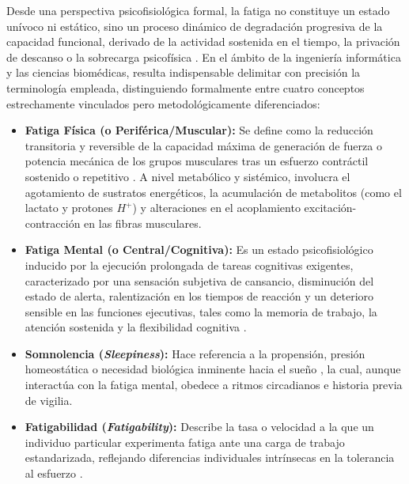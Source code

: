 Desde una perspectiva psicofisiológica formal, la fatiga no constituye un estado unívoco ni estático, sino un proceso dinámico de degradación progresiva de la capacidad funcional, derivado de la actividad sostenida en el tiempo, la privación de descanso o la sobrecarga psicofísica \cite{enoka2008muscle, grandjean1979fatigue}. En el ámbito de la ingeniería informática y las ciencias biomédicas, resulta indispensable delimitar con precisión la terminología empleada, distinguiendo formalmente entre cuatro conceptos estrechamente vinculados pero metodológicamente diferenciados:
\begin{itemize}
    \item \textbf{Fatiga Física (o Periférica/Muscular):} Se define como la reducción transitoria y reversible de la capacidad máxima de generación de fuerza o potencia mecánica de los grupos musculares tras un esfuerzo contráctil sostenido o repetitivo \cite{enoka2008muscle}. A nivel metabólico y sistémico, involucra el agotamiento de sustratos energéticos, la acumulación de metabolitos (como el lactato y protones $H^+$) y alteraciones en el acoplamiento excitación-contracción en las fibras musculares.
    \item \textbf{Fatiga Mental (o Central/Cognitiva):} Es un estado psicofisiológico inducido por la ejecución prolongada de tareas cognitivas exigentes, caracterizado por una sensación subjetiva de cansancio, disminución del estado de alerta, ralentización en los tiempos de reacción y un deterioro sensible en las funciones ejecutivas, tales como la memoria de trabajo, la atención sostenida y la flexibilidad cognitiva \cite{boksem2005effects}.
    \item \textbf{Somnolencia (\textit{Sleepiness}):} Hace referencia a la propensión, presión homeostática o necesidad biológica inminente hacia el sueño \cite{akerstedt1990subjective, hoddes1973quantification}, la cual, aunque interactúa con la fatiga mental, obedece a ritmos circadianos e historia previa de vigilia.
    \item \textbf{Fatigabilidad (\textit{Fatigability}):} Describe la tasa o velocidad a la que un individuo particular experimenta fatiga ante una carga de trabajo estandarizada, reflejando diferencias individuales intrínsecas en la tolerancia al esfuerzo \cite{kalanadhabhatta2021fatigueset}.
\end{itemize}

